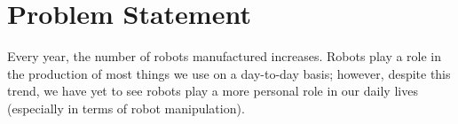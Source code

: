 \documentclass[12pt, letterpaper]{article}
\begin{document}
%
%
%
%
%
%
%
%
%
%
%
%
%
%
%
%
%
%
%
%
%

\setcounter{page}{1}

\section{Problem Statement}
Every year, the number of robots manufactured increases. Robots play a role in the production of most things we use on a day-to-day basis; however, despite this trend, we have yet to see robots play a more personal role in our daily lives (especially in terms of robot manipulation). 
\end{document}
